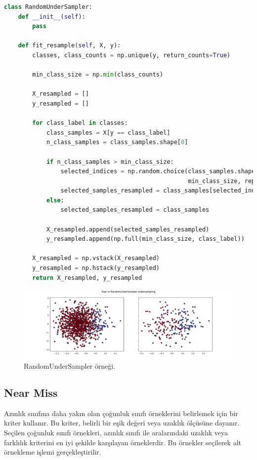 \begin{lstlisting}[language=Python]
class RandomUnderSampler:
    def __init__(self):
        pass

    def fit_resample(self, X, y):
        classes, class_counts = np.unique(y, return_counts=True)

        min_class_size = np.min(class_counts)

        X_resampled = []
        y_resampled = []

        for class_label in classes:
            class_samples = X[y == class_label]
            n_class_samples = class_samples.shape[0]

            if n_class_samples > min_class_size:
                selected_indices = np.random.choice(class_samples.shape[0], 
                                                    min_class_size, replace=False)
                selected_samples_resampled = class_samples[selected_indices]
            else:
                selected_samples_resampled = class_samples
            
            X_resampled.append(selected_samples_resampled)
            y_resampled.append(np.full(min_class_size, class_label))
            
        X_resampled = np.vstack(X_resampled)
        y_resampled = np.hstack(y_resampled)
        return X_resampled, y_resampled
\end{lstlisting}

\begin{figure}[h]
    \centering
    \includegraphics[width=1\textwidth]{images/Raw vs RandomUnderSampler undersampling.png}
    \caption{RandomUnderSampler örneği.}
    \label{fig:enter-label}
\end{figure}

\newpage

\subsection{Near Miss}
Azınlık sınıfına daha yakın olan çoğunluk sınıfı örneklerini belirlemek için bir kriter kullanır. Bu kriter, belirli bir eşik değeri veya uzaklık ölçüsüne dayanır. Seçilen çoğunluk sınıfı örnekleri, azınlık sınıfı ile aralarındaki uzaklık veya farklılık kriterini en iyi şekilde karşılayan örneklerdir. Bu örnekler seçilerek alt örnekleme işlemi gerçekleştirilir.

